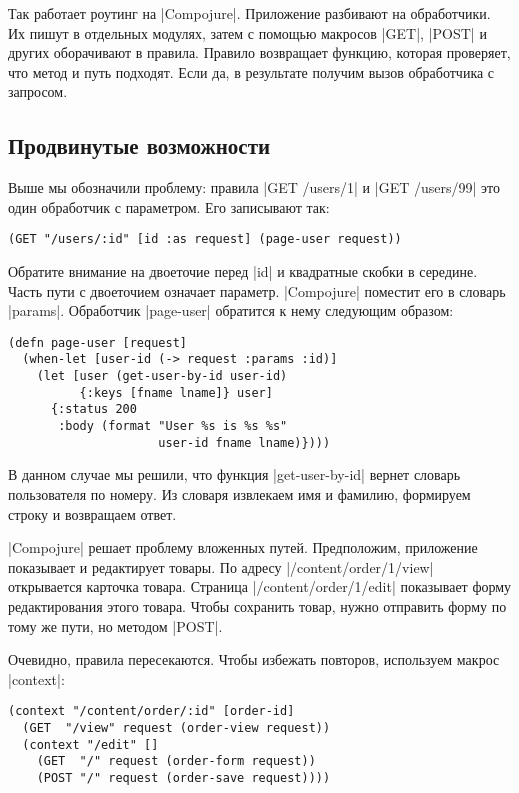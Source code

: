 Так работает роутинг на \spverb|Compojure|. Приложение разбивают на обработчики.
Их пишут в отдельных модулях, затем с помощью макросов \spverb|GET|, \spverb|POST|
и других оборачивают в правила. Правило возвращает функцию, которая
проверяет, что метод и путь подходят. Если да, в результате получим вызов
обработчика с запросом.

\subsection{Продвинутые возможности}

Выше мы обозначили проблему: правила \spverb|GET /users/1| и \spverb|GET /users/99|
это один обработчик с параметром. Его записывают так:

\begin{verbatim}
(GET "/users/:id" [id :as request] (page-user request))
\end{verbatim}

Обратите внимание на двоеточие перед \spverb|id| и квадратные скобки в середине.
Часть пути с двоеточием означает параметр. \spverb|Compojure| поместит его в словарь
\spverb|params|. Обработчик \spverb|page-user| обратится к нему следующим образом:

\begin{verbatim}
(defn page-user [request]
  (when-let [user-id (-> request :params :id)]
    (let [user (get-user-by-id user-id)
          {:keys [fname lname]} user]
      {:status 200
       :body (format "User %s is %s %s"
                     user-id fname lname)})))
\end{verbatim}

В данном случае мы решили, что функция \spverb|get-user-by-id| вернет словарь
пользователя по номеру. Из словаря извлекаем имя и фамилию, формируем
строку и возвращаем ответ.

\spverb|Compojure| решает проблему вложенных путей. Предположим, приложение показывает и
редактирует товары. По адресу \spverb|/content/order/1/view| открывается карточка
товара. Страница \spverb|/content/order/1/edit| показывает форму редактирования этого товара.
Чтобы сохранить товар, нужно отправить форму по тому же пути, но методом \spverb|POST|.

Очевидно, правила пересекаются. Чтобы избежать повторов, используем макрос \spverb|context|:

\begin{verbatim}
(context "/content/order/:id" [order-id]
  (GET  "/view" request (order-view request))
  (context "/edit" []
    (GET  "/" request (order-form request))
    (POST "/" request (order-save request))))
\end{verbatim}

